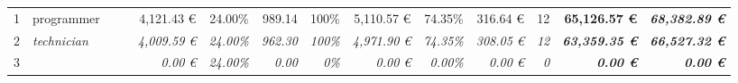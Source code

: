 \begin{table}[]
\begin{tabular}{cllllrrrrrrrrrr}
1                                                                                       & \multicolumn{2}{l}{\cellcolor[HTML]{FFFF99}programmer}                                                       & \cellcolor[HTML]{FFFF99}              & \cellcolor[HTML]{FFFF99}                     & \cellcolor[HTML]{FFFF99}4,121.43 €                                                   & 24.00\%                                                   & 989.14                                                   & \cellcolor[HTML]{FFFF99}100\%                                         & \cellcolor[HTML]{92D050}5,110.57 €                                    & \cellcolor[HTML]{FFFF99}74.35\%                                        & \cellcolor[HTML]{92D050}316.64 €                                            & \cellcolor[HTML]{FFFF99}12                                                    & \cellcolor[HTML]{BFBFBF}\textbf{65,126.57 €}                             & {\color[HTML]{FF0000} \textit{\textbf{68,382.89 €}}}                                 \\
2                                                                                       & \multicolumn{2}{l}{\cellcolor[HTML]{FFFF99}\textit{technician}}                                              & \cellcolor[HTML]{FFFF99}              & \cellcolor[HTML]{FFFF99}                     & \cellcolor[HTML]{FFFF99}\textit{4,009.59 €}                                          & \textit{24.00\%}                                          & \textit{962.30}                                          & \cellcolor[HTML]{FFFF99}\textit{100\%}                                & \cellcolor[HTML]{92D050}\textit{4,971.90 €}                           & \cellcolor[HTML]{FFFF99}\textit{74.35\%}                               & \cellcolor[HTML]{92D050}\textit{308.05 €}                                   & \cellcolor[HTML]{FFFF99}\textit{12}                                           & \cellcolor[HTML]{BFBFBF}\textit{\textbf{63,359.35 €}}                    & \textit{\textbf{66,527.32 €}}                                                        \\
3                                                                                       & \multicolumn{2}{l}{\cellcolor[HTML]{FFFF99}\textit{}}                                                        & \cellcolor[HTML]{FFFF99}              & \cellcolor[HTML]{FFFF99}                     & \cellcolor[HTML]{FFFF99}\textit{0.00 €}                                              & \textit{24.00\%}                                          & \textit{0.00}                                            & \cellcolor[HTML]{FFFF99}\textit{0\%}                                  & \cellcolor[HTML]{92D050}\textit{0.00 €}                               & \cellcolor[HTML]{FFFF99}\textit{0.00\%}                                & \cellcolor[HTML]{92D050}\textit{0.00 €}                                     & \cellcolor[HTML]{FFFF99}\textit{0}                                            & \cellcolor[HTML]{BFBFBF}\textit{\textbf{0.00 €}}                         & \textit{\textbf{0.00 €}}                                                             \\

\end{tabular}
\end{table}
